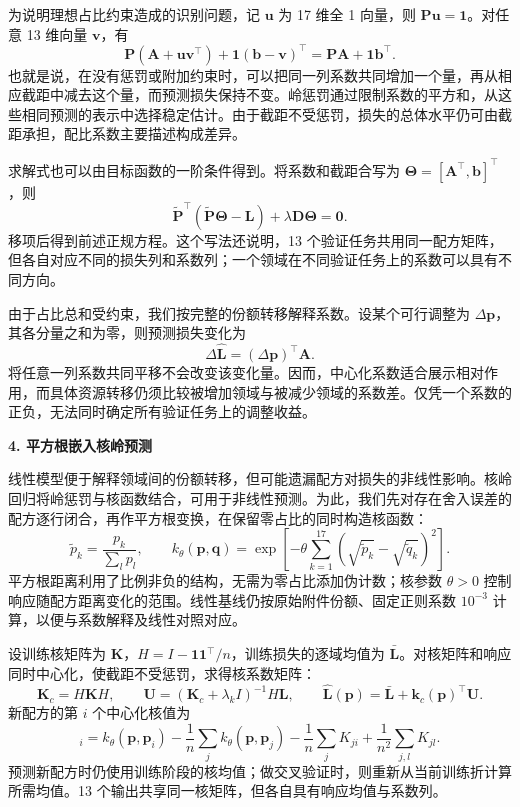 为说明理想占比约束造成的识别问题，记 $\bm u$ 为 17 维全 1 向量，则 $\bm P\bm u=\bm1$。对任意 13 维向量 $\bm v$，有
\[
 \bm P(\bm A+\bm u\bm v^\top)
 +\bm1(\bm b-\bm v)^\top
 =\bm P\bm A+\bm1\bm b^\top.
\]
也就是说，在没有惩罚或附加约束时，可以把同一列系数共同增加一个量，再从相应截距中减去这个量，而预测损失保持不变。岭惩罚通过限制系数的平方和，从这些相同预测的表示中选择稳定估计。由于截距不受惩罚，损失的总体水平仍可由截距承担，配比系数主要描述构成差异。

求解式也可以由目标函数的一阶条件得到。将系数和截距合写为 $\bm\Theta=[\bm A^\top,\bm b]^\top$，则
\[
 \tilde{\bm P}^{\top}
 (\tilde{\bm P}\bm\Theta-\bm L)
 +\lambda\bm D\bm\Theta=\bm0.
\]
移项后得到前述正规方程。这个写法还说明，13 个验证任务共用同一配方矩阵，但各自对应不同的损失列和系数列；一个领域在不同验证任务上的系数可以具有不同方向。

由于占比总和受约束，我们按完整的份额转移解释系数。设某个可行调整为 $\Delta\bm p$，其各分量之和为零，则预测损失变化为
\[
 \Delta\hat{\bm L}
 =(\Delta\bm p)^\top\bm A.
\]
将任意一列系数共同平移不会改变该变化量。因而，中心化系数适合展示相对作用，而具体资源转移仍须比较被增加领域与被减少领域的系数差。仅凭一个系数的正负，无法同时确定所有验证任务上的调整收益。

\textbf{4. 平方根嵌入核岭预测}\par\nopagebreak[4]

线性模型便于解释领域间的份额转移，但可能遗漏配方对损失的非线性影响。核岭回归将岭惩罚与核函数结合，可用于非线性预测\cite{sklearn_krr}。为此，我们先对存在舍入误差的配方逐行闭合，再作平方根变换，在保留零占比的同时构造核函数：
\begin{equation}
 \tilde p_k=\frac{p_k}{\sum_l p_l},\qquad
 k_\theta(\bm p,\bm q)=\exp\!\left[-\theta\sum_{k=1}^{17}
 (\sqrt{\tilde p_k}-\sqrt{\tilde q_k})^2\right].
\end{equation}
平方根距离利用了比例非负的结构，无需为零占比添加伪计数；核参数 $\theta>0$ 控制响应随配方距离变化的范围。线性基线仍按原始附件份额、固定正则系数 $10^{-3}$ 计算，以便与系数解释及线性对照对应。

设训练核矩阵为 $\bm K$，$H=I-\bm1\bm1^\top/n$，训练损失的逐域均值为 $\bar{\bm L}$。对核矩阵和响应同时中心化，使截距不受惩罚，求得核系数矩阵：
\begin{equation}
 \bm K_c=H\bm K H,\qquad
 \bm U=(\bm K_c+\lambda_k I)^{-1}H\bm L,\qquad
 \hat{\bm L}(\bm p)=\bar{\bm L}+\bm k_c(\bm p)^\top\bm U.
\end{equation}
新配方的第 $i$ 个中心化核值为
\begin{equation}
 [\bm k_c(\bm p)]_i=k_\theta(\bm p,\bm p_i)
 -\frac1n\sum_j k_\theta(\bm p,\bm p_j)
 -\frac1n\sum_j K_{ji}+\frac1{n^2}\sum_{j,l}K_{jl}.
\end{equation}
预测新配方时仍使用训练阶段的核均值；做交叉验证时，则重新从当前训练折计算所需均值。13 个输出共享同一核矩阵，但各自具有响应均值与系数列。

